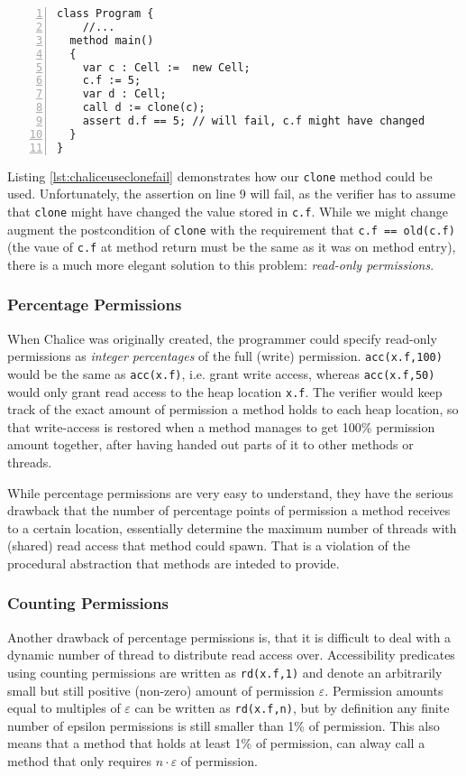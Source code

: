 \begin{lstlisting}[float,language=Chalice,caption={Calling \lstinline!Program::clone! (extension of Listing \ref{lst:chaliceexampleaccnew})},label={lst:chaliceuseclonefail},numbers=left]
class Program {  
	//...
  method main()
  {
    var c : Cell :=  new Cell;
    c.f := 5;
    var d : Cell;
    call d := clone(c);
    assert d.f == 5; // will fail, c.f might have changed
  }
}
\end{lstlisting}

Listing \ref{lst:chaliceuseclonefail} demonstrates how our \lstinline!clone! method could be used. 
Unfortunately, the assertion on line 9 will fail, as the verifier has to assume that \lstinline!clone! might have changed the value stored in \lstinline!c.f!.
While we might change augment the postcondition of \lstinline!clone! with the requirement that \lstinline!c.f == old(c.f)! (the vaue of \lstinline!c.f! at method return must be the same as it was on method entry), there is a much more elegant solution to this problem: \emph{read-only permissions}.

\subsubsection{Percentage Permissions}
When Chalice was originally created, the programmer could specify read-only permissions as \emph{integer percentages} of the full (write) permission. 
\lstinline!acc(x.f,100)! would be the same as \lstinline!acc(x.f)!, i.e. grant write access, whereas \lstinline!acc(x.f,50)! would only grant read access to the heap location \lstinline!x.f!.
The verifier would keep track of the exact amount of permission a method holds to each heap location, so that write-access is restored when a method manages to get 100\% permission amount together, after having handed out parts of it to other methods or threads.

While percentage permissions are very easy to understand, they have the serious drawback that the number of percentage points of permission a method receives to a certain location, essentially determine the maximum number of threads with (shared) read access that method could spawn.
That is a violation of the procedural abstraction that methods are inteded to provide.

\subsubsection{Counting Permissions}
Another drawback of percentage permissions is, that it is difficult to deal with a dynamic number of thread to distribute read access over.
Accessibility predicates using counting permissions are written as \lstinline!rd(x.f,1)! and denote an arbitrarily small but still positive (non-zero) amount of permission $\varepsilon$. 
Permission amounts equal to multiples of $\varepsilon$ can be written as \lstinline!rd(x.f,n)!, but by definition any finite number of epsilon permissions is still smaller than 1\% of permission.
This also means that a method that holds at least 1\% of permission, can alway call a method that only requires $n\cdot{}\varepsilon$ of permission.

